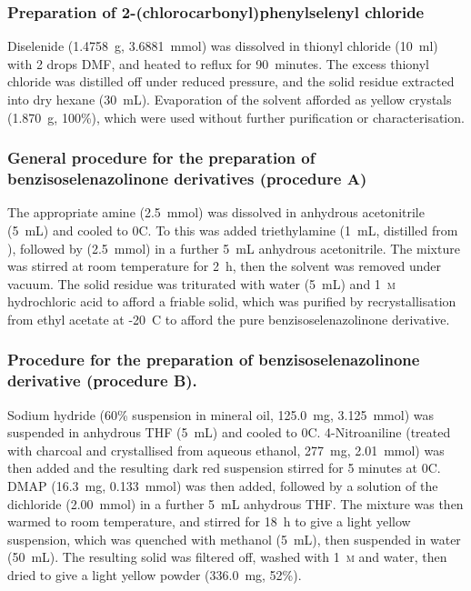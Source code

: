 \begin{refsection}
\subsubsection[Preparation of \refcmpd{dichloride}]{Preparation of 2-(chlorocarbonyl)phenylselenyl chloride }
Diselenide  (1.4758~g, 3.6881~mmol) was dissolved in thionyl chloride (10~ml) with 2 drops DMF, and heated to reflux for 90~minutes.
The excess thionyl chloride was distilled off under reduced pressure, and the solid residue extracted into dry hexane (30~mL).
Evaporation of the solvent afforded  as yellow crystals (1.870~g, 100\%), which were used without further purification or characterisation.

\subsubsection[General procedure A]{General procedure for the preparation of benzisoselenazolinone derivatives  (procedure A)}
The appropriate amine (2.5~mmol) was dissolved in anhydrous acetonitrile (5~mL) and cooled to 0\degree{}C.
To this was added triethylamine (1~mL, distilled from ), followed by  (2.5~mmol) in a further 5~mL anhydrous acetonitrile.
The mixture was stirred at room temperature for 2~h, then the solvent was removed under vacuum.
The solid residue was triturated with water (5~mL) and 1~\textsc{m} hydrochloric acid to afford a friable solid, which was purified by recrystallisation from ethyl acetate at -20\degree~C to afford the pure benzisoselenazolinone derivative.

\subsubsection[General procedure B]{Procedure for the preparation of benzisoselenazolinone derivative  (procedure B).}
Sodium hydride (60\% suspension in mineral oil, 125.0~mg, 3.125~mmol) was suspended in anhydrous THF (5~mL) and cooled to 0\degree{}C.
4-Nitroaniline (treated with charcoal and crystallised from aqueous ethanol, 277~mg, 2.01~mmol) was then added and the resulting dark red suspension stirred for 5 minutes at 0\degree{}C.
DMAP (16.3~mg, 0.133~mmol) was then added, followed by a solution of the dichloride  (2.00~mmol) in a further 5~mL anhydrous THF.\@
The mixture was then warmed to room temperature, and stirred for 18~h to give a light yellow suspension, which was quenched with methanol (5~mL), then suspended in water (50~mL).
The resulting solid was filtered off, washed with 1~\textsc{m}  and water, then dried to give a light yellow powder (336.0~mg, 52\%).


\end{refsection}
